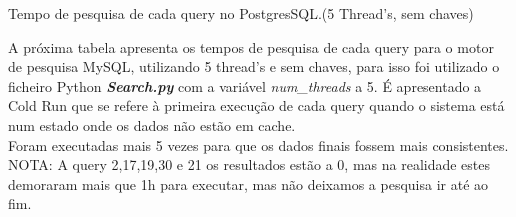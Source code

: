 \documentclass{article}
\begin{document}
\begin{table}[H]
    \caption{Tempo de pesquisa de cada query no PostgresSQL.(5 Thread's, sem chaves)}
    \label{tab:BC_Table3}
  \end{table}
\clearpage

\quad A próxima tabela apresenta os tempos de pesquisa de cada query para o motor de pesquisa MySQL, utilizando 5 thread's e sem chaves, para isso foi utilizado o ficheiro Python \textbf{\textit{Search.py}}  com a variável \textit{num\_threads} a 5. 
\quad É apresentado a Cold Run que se refere à primeira execução de cada query quando o sistema está num estado onde os dados não estão em cache.\\
Foram executadas mais 5 vezes para que os dados finais fossem mais consistentes.\\
NOTA: A query 2,17,19,30 e 21 os resultados estão a 0, mas na realidade estes demoraram mais que 1h para executar, mas não deixamos a pesquisa ir até ao fim.
\end{document}
